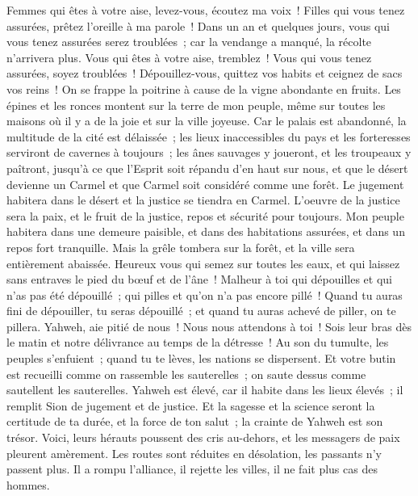 \begin{multicols}{2}
Femmes qui êtes à votre aise, levez-vous, écoutez ma voix~! Filles qui vous tenez assurées, prêtez l'oreille à ma parole~!
Dans un an et quelques jours, vous qui vous tenez assurées serez troublées~; car la vendange a manqué, la récolte n'arrivera plus.
Vous qui êtes à votre aise, tremblez~! Vous qui vous tenez assurées, soyez troublées~! Dépouillez-vous, quittez vos habits et ceignez de sacs vos reins~!
On se frappe la poitrine à cause de la vigne abondante en fruits.
Les épines et les ronces montent sur la terre de mon peuple, même sur toutes les maisons où il y a de la joie et sur la ville joyeuse.
Car le palais est abandonné, la multitude de la cité est délaissée~; les lieux inaccessibles du pays et les forteresses serviront de cavernes à toujours~; les ânes sauvages y joueront, et les troupeaux y paîtront,
jusqu'à ce que l'Esprit soit répandu d'en haut sur nous, et que le désert devienne un Carmel et que Carmel soit considéré comme une forêt.
Le jugement habitera dans le désert et la justice se tiendra en Carmel.
L'oeuvre de la justice sera la paix, et le fruit de la justice, repos et sécurité pour toujours.
Mon peuple habitera dans une demeure paisible, et dans des habitations assurées, et dans un repos fort tranquille.
Mais la grêle tombera sur la forêt, et la ville sera entièrement abaissée.
Heureux vous qui semez sur toutes les eaux, et qui laissez sans entraves le pied du bœuf et de l'âne~!
\VerseOne{}Malheur à toi qui dépouilles et qui n'as pas été dépouillé~; qui pilles et qu'on n'a pas encore pillé~! Quand tu auras fini de dépouiller, tu seras dépouillé~; et quand tu auras achevé de piller, on te pillera.
Yahweh, aie pitié de nous~! Nous nous attendons à toi~! Sois leur bras dès le matin et notre délivrance au temps de la détresse~!
Au son du tumulte, les peuples s'enfuient~; quand tu te lèves, les nations se dispersent.
Et votre butin est recueilli comme on rassemble les sauterelles~; on saute dessus comme sautellent les sauterelles.
Yahweh est élevé, car il habite dans les lieux élevés~; il remplit Sion de jugement et de justice.
Et la sagesse et la science seront la certitude de ta durée, et la force de ton salut~; la crainte de Yahweh est son trésor.
Voici, leurs hérauts poussent des cris au-dehors, et les messagers de paix pleurent amèrement.
Les routes sont réduites en désolation, les passants n'y passent plus. Il a rompu l'alliance, il rejette les villes, il ne fait plus cas des hommes.

\end{multicols}
